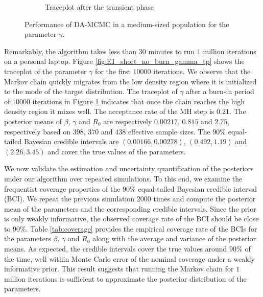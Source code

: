 \documentclass[12pt]{article}
\begin{document}
\begin{figure}
\begin{center}
\begin{subfigure}[b]{0.32\textwidth}
				\caption{Traceplot after the transient phase}
				\label{fig:E1_burn_gamma_tp}
			\end{subfigure}
		\end{center}
		\caption{Performance of DA-MCMC in a medium-sized population for the parameter $\gamma$.
			\label{fig:E1}}
	\end{figure}
	
	Remarkably, the algorithm takes less than $30$ minutes to run $1$ million iterations on a personal laptop. 
	Figure \ref{fig:E1_short_no_burn_gamma_tp} shows the traceplot of the parameter $\gamma$ for the first $10000$ iterations. We observe that the Markov chain quickly migrates from the low density region where it is initialized to the mode of the target distribution. The traceplot of $\gamma$ after a burn-in period of $10000$ iterations in Figure \ref{fig:E1_burn_gamma_tp} indicates that once the chain reaches the high density region it mixes well. The acceptance rate of the MH step is $0.21$.
	The posterior means of $\beta$, $\gamma$ and $R_0$ are respectively $0.00217$, $0.815$ and $2.75$, respectively based on $398$, $370$ and $438$ effective sample sizes. The $90\%$ equal-tailed Bayesian credible intervals are $(0.00166, 0.00278)$, $(0.492, 1.19)$ and $(2.26, 3.45)$ and cover the true values of the parameters. 
	
	We now validate the estimation and uncertainty quantification of the posteriors under our algorithm over repeated simulations. To this end, we examine the frequentist coverage properties of the $90\%$ equal-tailed Bayesian credible interval (BCI). We repeat the previous simulation $2000$ times and compute the posterior mean of the parameters and the corresponding credible intervals. Since the prior is only weakly informative, the observed coverage rate of the BCI should be close to $90\%$.
	Table \ref{tab:coverage} provides the empirical coverage rate of the BCIs for the parameters $\beta$, $\gamma$ and $R_0$ along with the average and variance of the posterior means. As expected, the credible intervals cover the true values around $90\%$ of the time, well within Monte Carlo error of the nominal coverage under a weakly informative prior. This result suggests that running the Markov chain for $1$ million iterations is sufficient to approximate the posterior distribution of the parameters.
	
\end{document}

